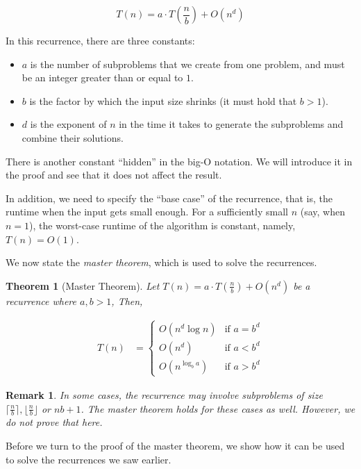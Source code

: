\documentclass [12pt]{article}
\newtheorem{theorem}{Theorem}
\newtheorem{remark}{Remark}
\begin{document}
$$
T(n) = a \cdot T \left( \frac{n}{b} \right) + O(n^d)
$$

In this recurrence, there are three constants:

\begin{itemize}
    \item $a$ is the number of subproblems that we create from one problem, and must be an integer greater than or equal to $1$.
    \item $b$ is the factor by which the input size shrinks (it must hold that $b > 1$).
    \item $d$ is the exponent of $n$ in the time it takes to generate the subproblems and combine their solutions.
\end{itemize}

There is another constant ``hidden'' in the big-O notation. We will introduce it in the proof and see that it does not affect the result.

In addition, we need to specify the ``base case'' of the recurrence, that is, the runtime when the input gets small enough. For a sufficiently small $n$ (say, when $n = 1$), the worst-case runtime of the algorithm is constant, namely, $T(n) = O(1)$.

We now state the \textit{master theorem}, which is used to solve the recurrences.

\begin{theorem}[Master Theorem]
Let $T(n) = a \cdot T\left(\frac{n}{b}\right) + O(n^d)$ be a recurrence where $a, b > 1$, Then,

\begin{align*}
T(n) &= \begin{cases}
    O(n^d \log n) & \text{if } a = b^d \\
    O(n^d) & \text{if } a < b^d \\
    O(n^{\log_b a}) & \text{if } a > b^d
\end{cases}
\end{align*}
\end{theorem}

\begin{remark}
In some cases, the recurrence may involve subproblems of size $\lceil \frac{n}{b} \rceil, \lfloor \frac{n}{b} \rfloor$ or $nb + 1$. The master theorem holds for these cases as well. However, we do not prove that here.
\end{remark}

Before we turn to the proof of the master theorem, we show how it can be used to solve the recurrences we saw earlier.
\end{document}
